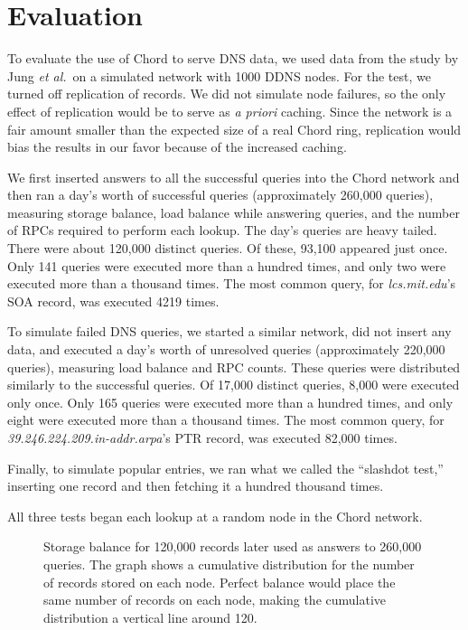 \section{Evaluation}

To evaluate the use of Chord to serve DNS data,
we used data from the study by Jung {\em et al.}\ on
a simulated network with 1000 DDNS nodes.
For the test, we turned off replication of records.
We did not simulate node failures,
so the only effect of replication would be to serve
as {\em a priori} caching.
Since the network is a fair amount smaller than the expected
size of a real Chord ring, replication would
bias the results in our favor because of the increased caching.

We first inserted answers to all the successful queries into the Chord network
and then ran a day's worth of successful queries
(approximately 260,000 queries),
measuring storage balance, load balance while answering
queries, and the number of RPCs required to perform each lookup.
The day's queries are heavy tailed.
There were about 120,000 distinct queries.  Of these, 93,100 appeared
just once.
Only 141 queries were executed more than a hundred times,
and only two were executed more than a thousand times.
The most common query, for {\em lcs.mit.edu}'s SOA record,
was executed 4219 times.

To simulate failed DNS queries, we started a similar network, did not insert
any data, and executed a day's worth of unresolved queries (approximately
220,000 queries), measuring
load balance and RPC counts.
These queries were distributed similarly to the successful queries.
Of 17,000 distinct queries, 8,000 were executed only once.
Only 165 queries were executed more than a hundred times,
and only eight were executed more than a thousand times.
The most common query, for {\em 39.246.224.209.in-addr.arpa}'s
PTR record, was executed 82,000 times.

Finally, to simulate popular entries, we ran what we called the ``slashdot test,''
inserting one record and then fetching it a hundred thousand times.

All three tests began each lookup at a random node in the Chord network.

\begin{figure}
\caption{
Storage balance for 120,000 records later used as answers to
260,000 queries.
The graph shows a cumulative distribution for the number 
of records stored on each node.
Perfect balance would place the same number of records
on each node, making the cumulative distribution a vertical line
around 120.}
\label{fig:store}
\end{figure}

